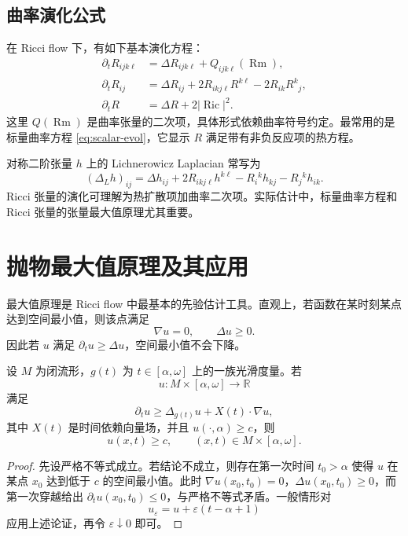 \documentclass[11pt,a4paper,cn,nofont,math=cm,mode=fancy,bibtex]{elegantbook}
\numberwithin{equation}{chapter}
\numberwithin{figure}{chapter}
\newcommand{\Ric}{\operatorname{Ric}}
\newcommand{\Rm}{\operatorname{Rm}}
\newcommand{\norm}[1]{\left\lvert #1\right\rvert}
\begin{document}
\section{曲率演化公式}

在 Ricci flow 下，有如下基本演化方程：
\begin{align}
  \partial_t R_{ijk\ell}
  &=\Delta R_{ijk\ell}+Q_{ijk\ell}(\Rm),\label{eq:Rm-evol}\\
  \partial_t R_{ij}
  &=\Delta R_{ij}+2R_{ikj\ell}R^{k\ell}-2R_{ik}R^k{}_j,\label{eq:Ric-evol}\\
  \partial_t R
  &=\Delta R+2\norm{\Ric}^2.\label{eq:scalar-evol}
\end{align}
这里 $Q(\Rm)$ 是曲率张量的二次项，具体形式依赖曲率符号约定。最常用的是标量曲率方程 \eqref{eq:scalar-evol}，它显示 $R$ 满足带有非负反应项的热方程。

\begin{rmk}
对称二阶张量 $h$ 上的 Lichnerowicz Laplacian 常写为
\[
  (\Delta_L h)_{ij}
  =\Delta h_{ij}+2R_{ikj\ell}h^{k\ell}-R_i{}^k h_{kj}-R_j{}^k h_{ik}.
\]
Ricci 张量的演化可理解为热扩散项加曲率二次项。实际估计中，标量曲率方程和 Ricci 张量的张量最大值原理尤其重要。
\end{rmk}

\chapter{抛物最大值原理及其应用}

最大值原理是 Ricci flow 中最基本的先验估计工具。直观上，若函数在某时刻某点达到空间最小值，则该点满足
\[
  \nabla u=0,
  \qquad \Delta u\ge 0.
\]
因此若 $u$ 满足 $\partial_tu\ge \Delta u$，空间最小值不会下降。

\begin{lem}[带漂移项的抛物最大值原理]\label{lem:max-principle}
设 $M$ 为闭流形，$g(t)$ 为 $t\in[\alpha,\omega]$ 上的一族光滑度量。若
\[
  u:M\times[\alpha,\omega]\to\mathbb R
\]
满足
\begin{equation}\label{eq:max-drift}
  \partial_t u\ge \Delta_{g(t)}u+X(t)\cdot\nabla u,
\end{equation}
其中 $X(t)$ 是时间依赖向量场，并且 $u(\cdot,\alpha)\ge c$，则
\[
  u(x,t)\ge c,
  \qquad (x,t)\in M\times[\alpha,\omega].
\]
\end{lem}

\begin{proof}
先设严格不等式成立。若结论不成立，则存在第一次时间 $t_0>\alpha$ 使得 $u$ 在某点 $x_0$ 达到低于 $c$ 的空间最小值。此时 $\nabla u(x_0,t_0)=0$，$\Delta u(x_0,t_0)\ge0$，而第一次穿越给出 $\partial_tu(x_0,t_0)\le0$，与严格不等式矛盾。一般情形对
\[
  u_\varepsilon=u+\varepsilon(t-\alpha+1)
\]
应用上述论证，再令 $\varepsilon\downarrow0$ 即可。
\end{proof}
\end{document}
